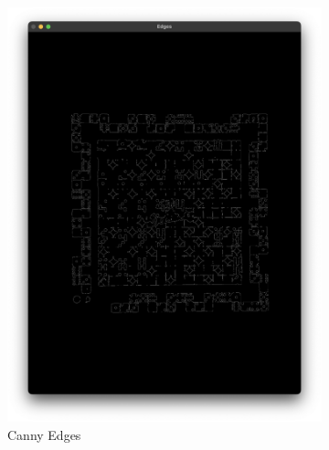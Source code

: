 \documentclass[12pt]{article}
\begin{document}
    \begin{figure}[!h]
        \ContinuedFloat
        \centering
        \begin{subfigure}{.5\textwidth}
            \centering
            \includegraphics[width=0.9\linewidth]{images/board_extraction/edges.png}
            \caption{Canny Edges}
            \label{fig:be-edges}
        \end{subfigure}%
        \begin{subfigure}{.5\textwidth}
            \centering

\end{subfigure}
\end{figure}
\end{document}
